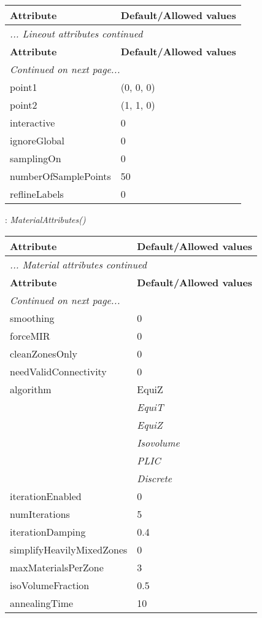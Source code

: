 \documentclass[10pt,a4paper]{report}
\begin{document}
\begin{longtable}{ll}
{\bf Attribute} & {\bf Default/Allowed values} \\
\hline \hline
\endfirsthead
\multicolumn{2}{l}{{\it ... Lineout attributes continued}} \\
{\bf Attribute} & {\bf Default/Allowed values} \\
\hline \hline
\endhead
\hline
\multicolumn{2}{l}{{\it Continued on next page...}} \\
\endfoot
\hline
\endlastfoot

point1  &  (0, 0, 0) \\
point2  &  (1, 1, 0) \\
interactive  &  0 \\
ignoreGlobal  &  0 \\
samplingOn  &  0 \\
numberOfSamplePoints  &  50 \\
reflineLabels  &  0 \\
\end{longtable}

\newpage

{}
: {\it MaterialAttributes() }\\[-3mm]

\begin{longtable}{ll}
{\bf Attribute} & {\bf Default/Allowed values} \\
\hline \hline
\endfirsthead
\multicolumn{2}{l}{{\it ... Material attributes continued}} \\
{\bf Attribute} & {\bf Default/Allowed values} \\
\hline \hline
\endhead
\hline
\multicolumn{2}{l}{{\it Continued on next page...}} \\
\endfoot
\hline
\endlastfoot

smoothing  &  0 \\
forceMIR  &  0 \\
cleanZonesOnly  &  0 \\
needValidConnectivity  &  0 \\
algorithm  &  EquiZ   \\
 & {\it  EquiT} \\
 & {\it  EquiZ} \\
 & {\it  Isovolume} \\
 & {\it  PLIC} \\
 & {\it  Discrete} \\
iterationEnabled  &  0 \\
numIterations  &  5 \\
iterationDamping  &  0.4 \\
simplifyHeavilyMixedZones  &  0 \\
maxMaterialsPerZone  &  3 \\
isoVolumeFraction  &  0.5 \\
annealingTime  &  10 \\
\end{longtable}
\end{document}

